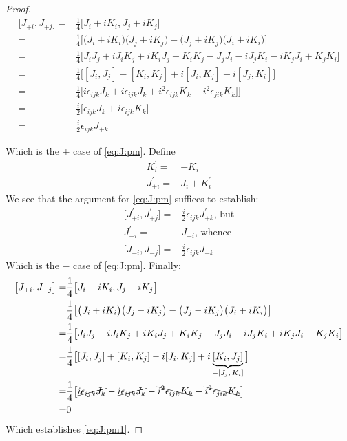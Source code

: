 \documentclass[]{article}
\begin{document}
\begin{proof}
	
	\begin{align*}
		\big[J_{+ i},	J_{+ j}\big]  = & \frac{1}{4}\big[J_i+ i K_i,J_j+ i K_j\big]\\
		 = & \frac{1}{4} \big[\big(J_i+ i K_i\big)\big(J_j+ i K_j\big)-\big(J_j+ i K_j\big)\big(J_i+ i K_i\big)\big]\\
		 = & \frac{1}{4} \big[J_iJ_j + i J_iK_j + iK_iJ_j - K_iK_j - J_jJ_i - i J_j K_i -i K_j J_i +K_jK_i\big]\\
		 = & \frac{1}{4} \big[[J_i,J_j] - [K_i,K_j] + i[J_i,K_j]-i[J_j,K_i] \big] \\
		 = & \frac{1}{4} \big[i\epsilon_{ijk}J_k +i\epsilon_{ijk}J_k + i^2\epsilon_{ijk}K_k-i^2\epsilon_{jik}K_k] \big]\\
		 =& \frac{i}{2} \big[\epsilon_{ijk}J_k+i \epsilon_{ijk}K_k\big]\\
		 =& \frac{i}{2} \epsilon_{ijk}J_{+ k}
	\end{align*}
	
	Which is the $+$ case of \eqref{eq:J:pm}. Define
	\begin{align*}
		K_i^\prime =& - K_i\\
		J_{+i}^\prime =& J_i +  K_i^\prime
	\end{align*}
	We see that the argument for \eqref{eq:J:pm} suffices to establish:
	\begin{align*}
		\big[J_{+ i}^\prime, J_{+ j}^\prime\big] =&  \frac{i}{2} \epsilon_{ijk}J_{+ k} ^\prime \text{, but}\\
		J_{+i}^\prime =& J_{-i}\text{, whence}\\
		\big[J_{- i}, J_{- j} \big] =&  \frac{i}{2} \epsilon_{ijk}J_{- k}
	\end{align*}
	Which is the $-$ case of \eqref{eq:J:pm}. Finally:
	\begin{align*}
		\big[J_{+ i},	J_{- j}\big]  = & \frac{1}{4}\big[J_i+ i K_i,J_j- i K_j\big]\\
		= & \frac{1}{4} \big[\big(J_i+ i K_i\big)\big(J_j- i K_j\big)-\big(J_j- i K_j\big)\big(J_i+ i K_i\big)\big]\\
		= & \frac{1}{4} \big[J_iJ_j -i J_iK_j +iK_iJ_j+K_iK_j - J_jJ_i -iJ_j K_i+iK_jJ_i-K_jK_i\big] \\
		= & \frac{1}{4} \big[[J_i,J_j] +[K_i,K_j]  -i[J_i,K_j] +i \underbrace{[K_i,J_j]}_\text{$-[J_j,K_i]$}\big] \\
		= & \frac{1}{4} \big[\cancel{i\epsilon_{ijk}J_k} - \cancel{i\epsilon_{ijk}J_k} -\bcancel{i^2\epsilon_{ijk}K_k} -\bcancel{i^2\epsilon_{jik}K_k}\big]\\
		=& 0
	\end{align*}
	Which establishes \eqref{eq:J:pm1}.
\end{proof}
\end{document}
